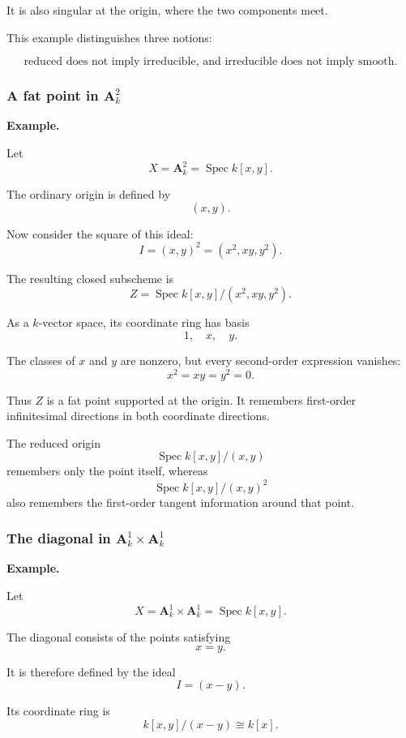 It is also singular at the origin, where the two components meet.

This example distinguishes three notions:

\[
\boxed{
	\text{reduced does not imply irreducible, and irreducible does not imply smooth.}
}
\]

\subsubsection{A fat point in \(\mathbf A^2_k\)}

\textbf{Example.}

Let
\[
X=\mathbf A^2_k=\operatorname{Spec}k[x,y].
\]

The ordinary origin is defined by
\[
(x,y).
\]

Now consider the square of this ideal:
\[
I=(x,y)^2=(x^2,xy,y^2).
\]

The resulting closed subscheme is
\[
Z=\operatorname{Spec}
k[x,y]/(x^2,xy,y^2).
\]

As a \(k\)-vector space, its coordinate ring has basis
\[
1,\quad x,\quad y.
\]

The classes of \(x\) and \(y\) are nonzero, but every second-order expression vanishes:
\[
x^2=xy=y^2=0.
\]

Thus \(Z\) is a fat point supported at the origin. It remembers first-order infinitesimal directions in both coordinate directions.

The reduced origin
\[
\operatorname{Spec}k[x,y]/(x,y)
\]
remembers only the point itself, whereas
\[
\operatorname{Spec}k[x,y]/(x,y)^2
\]
also remembers the first-order tangent information around that point.

\subsubsection{The diagonal in \(\mathbf A^1_k\times\mathbf A^1_k\)}

\textbf{Example.}

Let
\[
X=\mathbf A^1_k\times\mathbf A^1_k
=
\operatorname{Spec}k[x,y].
\]

The diagonal consists of the points satisfying
\[
x=y.
\]

It is therefore defined by the ideal
\[
I=(x-y).
\]

Its coordinate ring is
\[
k[x,y]/(x-y)\cong k[x].
\]

